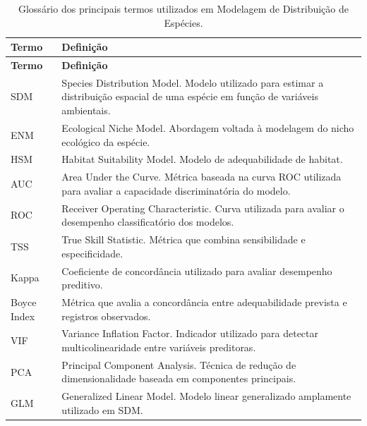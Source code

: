 \begin{longtable}{
		p{}
		p{}
	}
	
	\caption{Glossário dos principais termos utilizados em Modelagem de Distribuição de Espécies.}
	\label{tab:glossario_sdm}
	\\
	
	\toprule
	\textbf{Termo} &
	\textbf{Definição}
	\\
	\midrule
	\endfirsthead
	
	\toprule
	\textbf{Termo} &
	\textbf{Definição}
	\\
	\midrule
	\endhead
	
	SDM &
	Species Distribution Model. Modelo utilizado para estimar a distribuição espacial de uma espécie em função de variáveis ambientais.
	\\
	
	ENM &
	Ecological Niche Model. Abordagem voltada à modelagem do nicho ecológico da espécie.
	\\
	
	HSM &
	Habitat Suitability Model. Modelo de adequabilidade de habitat.
	\\
	
	AUC &
	Area Under the Curve. Métrica baseada na curva ROC utilizada para avaliar a capacidade discriminatória do modelo.
	\\
	
	ROC &
	Receiver Operating Characteristic. Curva utilizada para avaliar o desempenho classificatório dos modelos.
	\\
	
	TSS &
	True Skill Statistic. Métrica que combina sensibilidade e especificidade.
	\\
	
	Kappa &
	Coeficiente de concordância utilizado para avaliar desempenho preditivo.
	\\
	
	Boyce Index &
	Métrica que avalia a concordância entre adequabilidade prevista e registros observados.
	\\
	
	VIF &
	Variance Inflation Factor. Indicador utilizado para detectar multicolinearidade entre variáveis preditoras.
	\\
	
	PCA &
	Principal Component Analysis. Técnica de redução de dimensionalidade baseada em componentes principais.
	\\
	
	GLM &
	Generalized Linear Model. Modelo linear generalizado amplamente utilizado em SDM.
	\\
	

\end{longtable}
